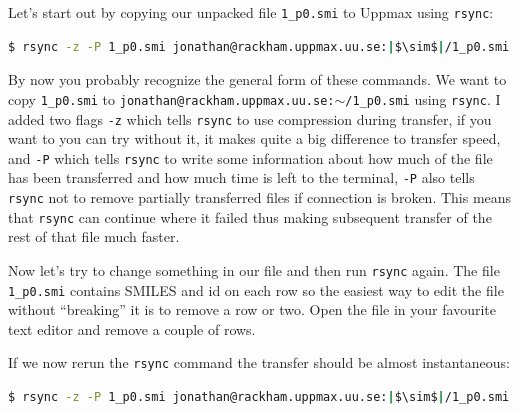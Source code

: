 \documentclass[watermark]{pbpreprint}
\begin{document}
Let's start out by copying our unpacked file \texttt{1\_p0.smi} to Uppmax using
\texttt{rsync}:
\begin{lstlisting}[language=bash,escapechar={|},basicstyle=\ttfamily\footnotesize]
$ rsync -z -P 1_p0.smi jonathan@rackham.uppmax.uu.se:|$\sim$|/1_p0.smi
\end{lstlisting}
By now you probably recognize the general form of these commands. We want to
copy \texttt{1\_p0.smi} to \texttt{jonathan@rackham.uppmax.uu.se:$\sim$/1\_p0.smi}
using \texttt{rsync}.  I added two flags \texttt{-z} which
tells \texttt{rsync} to use compression during transfer, if you want to you can
try without it, it makes quite a big difference to transfer speed, and
\texttt{-P} which tells \texttt{rsync} to write some information about how much
of the file has been transferred and how much time is left to the terminal,
\texttt{-P} also tells \texttt{rsync} not to remove partially transferred files
if connection is broken. This means that \texttt{rsync} can continue where it
failed thus making subsequent transfer of the rest of that file much faster. 

Now let's try to change something in our file and then run \texttt{rsync}
again. The file \texttt{1\_p0.smi} contains SMILES and id on each row so the
easiest way to edit the file without ``breaking'' it is to remove a row or two.
Open the file in your favourite text editor and remove a couple of rows.

If we now rerun the \texttt{rsync} command the transfer should be almost
instantaneous:
\begin{lstlisting}[language=bash,escapechar={|},basicstyle=\ttfamily\footnotesize]
$ rsync -z -P 1_p0.smi jonathan@rackham.uppmax.uu.se:|$\sim$|/1_p0.smi
\end{lstlisting}
\end{document}
